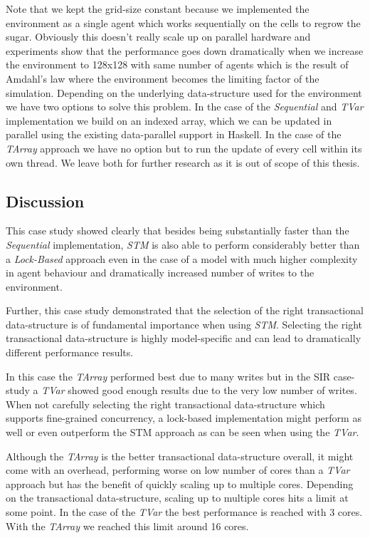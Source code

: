 Note that we kept the grid-size constant because we implemented the environment as a single agent which works sequentially on the cells to regrow the sugar. Obviously this doesn't really scale up on parallel hardware and experiments show that the performance goes down dramatically when we increase the environment to 128x128 with same number of agents which is the result of Amdahl's law where the environment becomes the limiting factor of the simulation. Depending on the underlying data-structure used for the environment we have two options to solve this problem. In the case of the \textit{Sequential} and \textit{TVar} implementation we build on an indexed array, which we can be updated in parallel using the existing data-parallel support in Haskell. In the case of the \textit{TArray} approach we have no option but to run the update of every cell within its own thread. We leave both for further research as it is out of scope of this thesis.

\subsection{Discussion}
This case study showed clearly that besides being substantially faster than the \textit{Sequential} implementation, \textit{STM} is also able to perform considerably better than a \textit{Lock-Based} approach even in the case of a model with much higher complexity in agent behaviour and dramatically increased number of writes to the environment.

Further, this case study demonstrated that the selection of the right transactional data-structure is of fundamental importance when using \textit{STM}. Selecting the right transactional data-structure is highly model-specific and can lead to dramatically different performance results.

In this case the \textit{TArray} performed best due to many writes but in the SIR case-study a \textit{TVar} showed good enough results due to the very low number of writes. When not carefully selecting the right transactional data-structure which supports fine-grained concurrency, a lock-based implementation might perform as well or even outperform the STM approach as can be seen when using the \textit{TVar}.

Although the \textit{TArray} is the better transactional data-structure overall, it might come with an overhead, performing worse on low number of cores than a \textit{TVar} approach but has the benefit of quickly scaling up to multiple cores. Depending on the transactional data-structure, scaling up to multiple cores hits a limit at some point. In the case of the \textit{TVar} the best performance is reached with 3 cores. With the \textit{TArray} we reached this limit around 16 cores.

